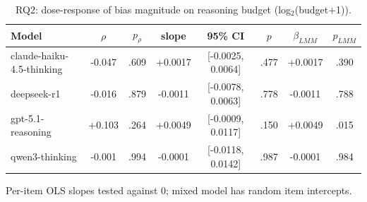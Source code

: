 \begin{table}[t]
\centering
\caption{RQ2: dose-response of bias magnitude on reasoning budget (log$_2$(budget+1)).}
\label{tab:rq2}
\small
\begin{tabular}{lccccccc}
\hline
Model & $\rho$ & $p_\rho$ & slope & 95\% CI & $p$ & $\beta_{LMM}$ & $p_{LMM}$ \\
\hline
claude-haiku-4.5-thinking & -0.047 & .609 & +0.0017 & [-0.0025, 0.0064] & .477 & +0.0017 & .390 \\
deepseek-r1 & -0.016 & .879 & -0.0011 & [-0.0078, 0.0063] & .778 & -0.0011 & .788 \\
gpt-5.1-reasoning & +0.103 & .264 & +0.0049 & [-0.0009, 0.0117] & .150 & +0.0049 & .015 \\
qwen3-thinking & -0.001 & .994 & -0.0001 & [-0.0118, 0.0142] & .987 & -0.0001 & .984 \\
\hline
\end{tabular}
\par\smallskip\footnotesize Per-item OLS slopes tested against 0; mixed model has random item intercepts.
\end{table}
